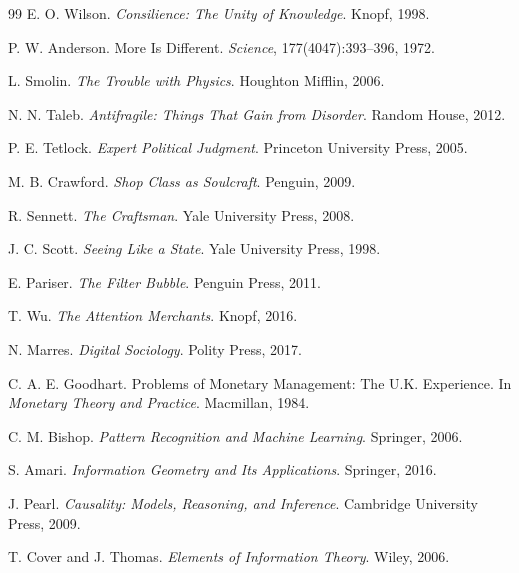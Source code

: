 \documentclass[12pt]{article}
\begin{document}
\begin{thebibliography}{99}
E. O. Wilson.
\newblock \emph{Consilience: The Unity of Knowledge}.
\newblock Knopf, 1998.

P. W. Anderson.
\newblock More Is Different.
\newblock \emph{Science}, 177(4047):393--396, 1972.

L. Smolin.
\newblock \emph{The Trouble with Physics}.
\newblock Houghton Mifflin, 2006.

N. N. Taleb.
\newblock \emph{Antifragile: Things That Gain from Disorder}.
\newblock Random House, 2012.

P. E. Tetlock.
\newblock \emph{Expert Political Judgment}.
\newblock Princeton University Press, 2005.

M. B. Crawford.
\newblock \emph{Shop Class as Soulcraft}.
\newblock Penguin, 2009.

R. Sennett.
\newblock \emph{The Craftsman}.
\newblock Yale University Press, 2008.

J. C. Scott.
\newblock \emph{Seeing Like a State}.
\newblock Yale University Press, 1998.

E. Pariser.
\newblock \emph{The Filter Bubble}.
\newblock Penguin Press, 2011.

T. Wu.
\newblock \emph{The Attention Merchants}.
\newblock Knopf, 2016.

N. Marres.
\newblock \emph{Digital Sociology}.
\newblock Polity Press, 2017.

C. A. E. Goodhart.
\newblock Problems of Monetary Management: The U.K. Experience.
\newblock In \emph{Monetary Theory and Practice}. Macmillan, 1984.

C. M. Bishop.
\newblock \emph{Pattern Recognition and Machine Learning}.
\newblock Springer, 2006.

S. Amari.
\newblock \emph{Information Geometry and Its Applications}.
\newblock Springer, 2016.

J. Pearl.
\newblock \emph{Causality: Models, Reasoning, and Inference}.
\newblock Cambridge University Press, 2009.

T. Cover and J. Thomas.
\newblock \emph{Elements of Information Theory}.
\newblock Wiley, 2006.

\end{thebibliography}
\end{document}
